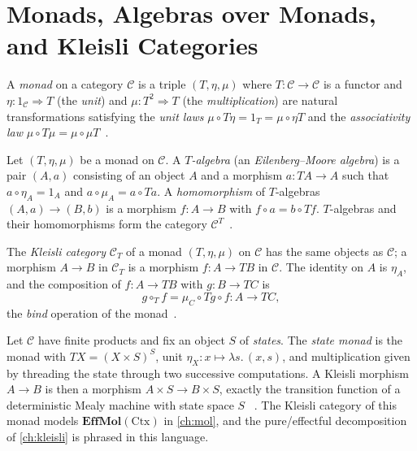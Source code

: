 \section{Monads, Algebras over Monads, and Kleisli Categories}\label{sec:prelim-monads}

\begin{definition}[Monad]
A \emph{monad} on a category $\mathcal{C}$ is a triple $(T, \eta, \mu)$ where
$T \colon \mathcal{C} \to \mathcal{C}$ is a functor and
$\eta \colon 1_{\mathcal{C}} \Rightarrow T$ (the \emph{unit}) and
$\mu \colon T^2 \Rightarrow T$ (the \emph{multiplication}) are natural
transformations satisfying the \emph{unit laws}
$\mu \circ T\eta = 1_T = \mu \circ \eta T$ and the \emph{associativity law}
$\mu \circ T\mu = \mu \circ \mu T$~\cite{maclane, arxiv-monads-kleisli}.
\end{definition}

\begin{definition}
Let $(T, \eta, \mu)$ be a monad on $\mathcal{C}$. A \emph{$T$-algebra}
(an \emph{Eilenberg--Moore algebra}) is a pair $(A, a)$ consisting of an
object $A$ and a morphism $a \colon T A \to A$ such that
$a \circ \eta_A = 1_A$ and $a \circ \mu_A = a \circ T a$. A \emph{homomorphism}
of $T$-algebras $(A,a) \to (B,b)$ is a morphism $f \colon A \to B$ with
$f \circ a = b \circ T f$. $T$-algebras and their homomorphisms form the
category $\mathcal{C}^T$~\cite{maclane}.
\end{definition}

\begin{definition}
The \emph{Kleisli category} $\mathcal{C}_T$ of a monad $(T, \eta, \mu)$ on
$\mathcal{C}$ has the same objects as $\mathcal{C}$; a morphism $A \to B$ in
$\mathcal{C}_T$ is a morphism $f \colon A \to T B$ in $\mathcal{C}$. The
identity on $A$ is $\eta_A$, and the composition of $f \colon A \to T B$ with
$g \colon B \to T C$ is
\[ g \circ_T f = \mu_C \circ T g \circ f \colon A \to T C, \]
the \emph{bind} operation of the monad~\cite{maclane, arxiv-monads-kleisli}.
\end{definition}

\begin{example}
Let $\mathcal{C}$ have finite products and fix an object $S$ of
\emph{states}. The \emph{state monad} is the monad with
$T X = (X \times S)^S$, unit $\eta_X \colon x \mapsto \lambda s.\,(x, s)$,
and multiplication given by threading the state through two successive
computations. A Kleisli morphism $A \to B$ is then a morphism
$A \times S \to B \times S$, exactly the transition function of a
deterministic Mealy machine with state space $S$
~\cite{maclane, arxiv-monads-kleisli, mealy, moore, arxiv-mealy}. The
Kleisli category of this monad models $\mathbf{EffMol} (\mathrm{Ctx})$ in
\autoref{ch:mol}, and the pure/effectful decomposition of
\autoref{ch:kleisli} is phrased in this language.
\end{example}

